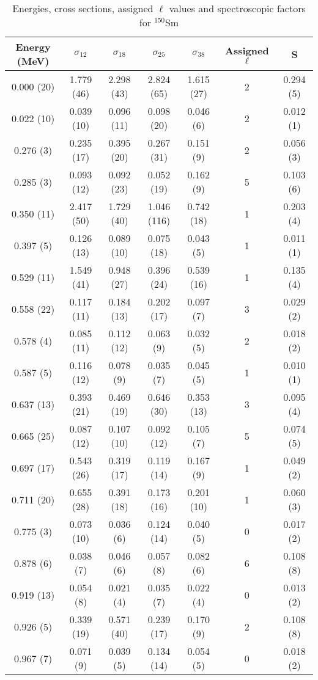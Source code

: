 \begin{table}
\caption{Energies, cross sections, assigned $\ell$ values and spectroscopic factors for $^{150}$Sm}
\begin{tabular}{c c c c c c c}
\hline \hline
Energy (MeV) & $\sigma_{12}$ & $\sigma_{18}$ & $\sigma_{25}$ & $\sigma_{38}$ & Assigned $\ell$ & S\\
\hline \hline
0.000 (20) & 1.779 (46) & 2.298 (43) & 2.824 (65) & 1.615 (27) & 2 & 0.294 (5) \\
0.022 (10) & 0.039 (10) & 0.096 (11) & 0.098 (20) & 0.046 (6) & 2 & 0.012 (1) \\
0.276 (3) & 0.235 (17) & 0.395 (20) & 0.267 (31) & 0.151 (9) & 2 & 0.056 (3) \\
0.285 (3) & 0.093 (12) & 0.092 (23) & 0.052 (19) & 0.162 (9) & 5 & 0.103 (6) \\
0.350 (11) & 2.417 (50) & 1.729 (40) & 1.046 (116) & 0.742 (18) & 1 & 0.203 (4) \\
0.397 (5) & 0.126 (13) & 0.089 (10) & 0.075 (18) & 0.043 (5) & 1 & 0.011 (1) \\
0.529 (11) & 1.549 (41) & 0.948 (27) & 0.396 (24) & 0.539 (16) & 1 & 0.135 (4) \\
0.558 (22) & 0.117 (11) & 0.184 (13) & 0.202 (17) & 0.097 (7) & 3 & 0.029 (2) \\
0.578 (4) & 0.085 (11) & 0.112 (12) & 0.063 (9) & 0.032 (5) & 2 & 0.018 (2) \\
0.587 (5) & 0.116 (12) & 0.078 (9) & 0.035 (7) & 0.045 (5) & 1 & 0.010 (1) \\
0.637 (13) & 0.393 (21) & 0.469 (19) & 0.646 (30) & 0.353 (13) & 3 & 0.095 (4) \\
0.665 (25) & 0.087 (12) & 0.107 (10) & 0.092 (12) & 0.105 (7) & 5 & 0.074 (5) \\
0.697 (17) & 0.543 (26) & 0.319 (17) & 0.119 (14) & 0.167 (9) & 1 & 0.049 (2) \\
0.711 (20) & 0.655 (28) & 0.391 (18) & 0.173 (16) & 0.201 (10) & 1 & 0.060 (3) \\
0.775 (3) & 0.073 (10) & 0.036 (6) & 0.124 (14) & 0.040 (5) & 0 & 0.017 (2) \\
0.878 (6) & 0.038 (7) & 0.046 (6) & 0.057 (8) & 0.082 (6) & 6 & 0.108 (8) \\
0.919 (13) & 0.054 (8) & 0.021 (4) & 0.035 (7) & 0.022 (4) & 0 & 0.013 (2) \\
0.926 (5) & 0.339 (19) & 0.571 (40) & 0.239 (17) & 0.170 (9) & 2 & 0.108 (8) \\
0.967 (7) & 0.071 (9) & 0.039 (5) & 0.134 (14) & 0.054 (5) & 0 & 0.018 (2) \\

\end{tabular}
\end{table}
